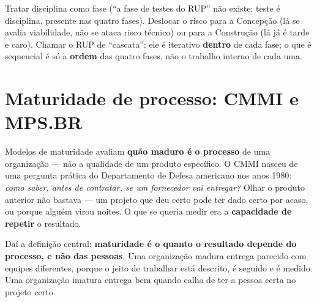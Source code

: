\begin{cuidado}
Tratar disciplina como fase (“a fase de testes do RUP” não existe: teste é
disciplina, presente nas quatro fases). Deslocar o risco para a Concepção
(lá se avalia viabilidade, não se ataca risco técnico) ou para a Construção
(lá já é tarde e caro). Chamar o RUP de “cascata”: ele é iterativo
\textbf{dentro} de cada fase; o que é sequencial é só a \textbf{ordem} das
quatro fases, não o trabalho interno de cada uma.
\end{cuidado}

\section{Maturidade de processo: CMMI e MPS.BR}

\begin{conceito}
Modelos de maturidade avaliam \textbf{quão maduro é o processo} de uma
organização --- não a qualidade de um produto específico. O CMMI nasceu de
uma pergunta prática do Departamento de Defesa americano nos anos 1980:
\textit{como saber, antes de contratar, se um fornecedor vai entregar?}
Olhar o produto anterior não bastava --- um projeto que deu certo pode ter
dado certo por acaso, ou porque alguém virou noites. O que se queria medir
era a \textbf{capacidade de repetir} o resultado.

Daí a definição central: \textbf{maturidade é o quanto o resultado depende
do processo, e não das pessoas}. Uma organização madura entrega parecido
com equipes diferentes, porque o jeito de trabalhar está descrito, é
seguido e é medido. Uma organização imatura entrega bem quando calha de ter
a pessoa certa no projeto certo.
\end{conceito}

